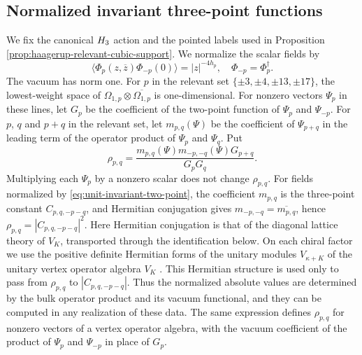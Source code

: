 \documentclass[leqno]{article}
\let\cal\relax
\newcommand{\cal}{\mathcal}
\newcommand{\ot}{\otimes}
\numberwithin{equation}{section}
\begin{document}
\subsection{Normalized invariant three-point functions}
\label{subsec:normalized-haagerup-ope}

We fix the canonical $\cal H_3$ action and the pointed labels used in Proposition \ref{prop:haagerup-relevant-cubic-support}. We normalize the scalar fields by
\begin{equation}
\label{eq:unit-invariant-two-point}
\langle\Phi_p(z,\overline z)\Phi_{-p}(0)\rangle = |z|^{-4h_p},
\quad \Phi_{-p} = \Phi_p^\dagger.
\end{equation}
The vacuum has norm one. For $p$ in the relevant set $\{\pm3,\pm4,\pm13,\pm17\}$, the lowest-weight space of $\Omega_{1,p}\ot\overline{\Omega_{1,p}}$ is one-dimensional. For nonzero vectors $\Psi_p$ in these lines, let $G_p$ be the coefficient of the two-point function of $\Psi_p$ and $\Psi_{-p}$. For $p$, $q$ and $p+q$ in the relevant set, let $m_{p,q}(\Psi)$ be the coefficient of $\Psi_{p+q}$ in the leading term of the operator product of $\Psi_p$ and $\Psi_q$. Put
\begin{equation}
\label{eq:rescaling-invariant-cubic}
\rho_{p,q} = \frac{m_{p,q}(\Psi)m_{-p,-q}(\Psi)G_{p+q}}{G_pG_q}.
\end{equation}
Multiplying each $\Psi_p$ by a nonzero scalar does not change $\rho_{p,q}$. For fields normalized by \eqref{eq:unit-invariant-two-point}, the coefficient $m_{p,q}$ is the three-point constant $C_{p,q,-p-q}$, and Hermitian conjugation gives $m_{-p,-q} = \overline{m_{p,q}}$, hence $\rho_{p,q} = |C_{p,q,-p-q}|^2$. Here Hermitian conjugation is that of the diagonal lattice theory of $V_K$, transported through the identification below. On each chiral factor we use the positive definite Hermitian forms of the unitary modules $V_{\kappa+K}$ of the unitary vertex operator algebra $V_K$ \cite[Theorem 4.12 p.~24]{DoL14}. This Hermitian structure is used only to pass from $\rho_{p,q}$ to $|C_{p,q,-p-q}|$. Thus the normalized absolute values are determined by the bulk operator product and its vacuum functional, and they can be computed in any realization of these data. The same expression defines $\rho_{p,q}$ for nonzero vectors of a vertex operator algebra, with the vacuum coefficient of the product of $\Psi_p$ and $\Psi_{-p}$ in place of $G_p$.
\end{document}
